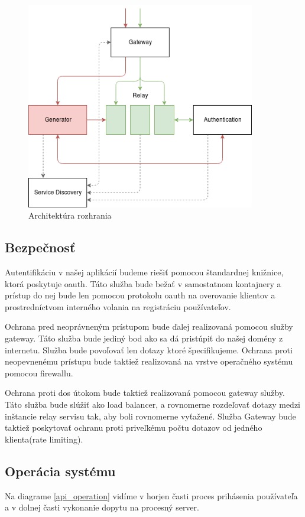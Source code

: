 \begin{figure}[!htbp] 
	\centering 
	\includegraphics[width=10cm]{img/architecture.png} 
	\caption{Architektúra rozhrania} 
	\label{architecture} 
\end{figure}  

\subsection{Bezpečnosť} 

Autentifikáciu v našej aplikácií budeme riešiť pomocou štandardnej knižnice, ktorá poskytuje \acrshort{oauth}. Táto služba bude bežať v samostatnom kontajnery a prístup do nej bude len pomocou protokolu \acrshort{oauth} na overovanie klientov a prostredníctvom interného volania na registráciu používateľov. 

Ochrana pred neoprávneným prístupom bude ďalej realizovaná pomocou služby gateway. Táto služba bude jediný bod ako sa dá pristúpiť do našej domény z internetu. Služba bude povoľovať len dotazy ktoré špecifikujeme. Ochrana proti neopevnenému prístupu bude taktiež realizovaná na vrstve operačného systému pomocou firewallu. 

Ochrana proti \acrshort{dos} útokom bude taktiež realizovaná pomocou gateway služby. Táto služba bude slúžiť ako load balancer, a rovnomerne rozdeľovať dotazy medzi inštancie relay servisu tak, aby boli rovnomerne vyťažené. Služba Gateway bude taktiež poskytovať ochranu proti priveľkému počtu dotazov od jedného klienta(rate limiting). 

\subsection{Operácia systému} 
Na diagrame \ref{api_operation} vidíme v horjen časti proces prihásenia používateľa a v dolnej časti vykonanie dopytu na procesný server. 

